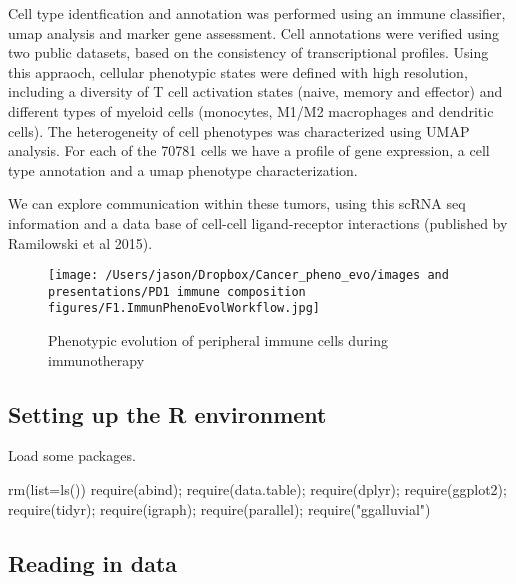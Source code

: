 \documentclass[
]{article}
\newenvironment{Shaded}{\begin{snugshade}}{\end{snugshade}}
\newcommand{\AttributeTok}[1]{\textcolor[rgb]{0.77,0.63,0.00}{#1}}
\newcommand{\FunctionTok}[1]{\textcolor[rgb]{0.00,0.00,0.00}{#1}}
\newcommand{\NormalTok}[1]{#1}
\newcommand{\StringTok}[1]{\textcolor[rgb]{0.31,0.60,0.02}{#1}}
\begin{document}
Cell type identfication and annotation was performed using an immune
classifier, umap analysis and marker gene assessment. Cell annotations
were verified using two public datasets, based on the consistency of
transcriptional profiles. Using this appraoch, cellular phenotypic
states were defined with high resolution, including a diversity of T
cell activation states (naive, memory and effector) and different types
of myeloid cells (monocytes, M1/M2 macrophages and dendritic cells). The
heterogeneity of cell phenotypes was characterized using UMAP analysis.
For each of the 70781 cells we have a profile of gene expression, a cell
type annotation and a umap phenotype characterization.

We can explore communication within these tumors, using this scRNA seq
information and a data base of cell-cell ligand-receptor interactions
(published by Ramilowski et al 2015).

\begin{figure}
\centering
\texttt{[image: /Users/jason/Dropbox/Cancer\_pheno\_evo/images and presentations/PD1 immune composition figures/F1.ImmunPhenoEvolWorkflow.jpg]}
\caption{Phenotypic evolution of peripheral immune cells during
immunotherapy}
\end{figure}

\hypertarget{setting-up-the-r-environment}{%
\subsection{Setting up the R
environment}\label{setting-up-the-r-environment}}

Load some packages.

\begin{Shaded}
\begin{Highlighting}[]
\FunctionTok{rm}\NormalTok{(}\AttributeTok{list=}\FunctionTok{ls}\NormalTok{())   }
\FunctionTok{require}\NormalTok{(abind); }\FunctionTok{require}\NormalTok{(data.table); }\FunctionTok{require}\NormalTok{(dplyr); }\FunctionTok{require}\NormalTok{(ggplot2); }\FunctionTok{require}\NormalTok{(tidyr); }\FunctionTok{require}\NormalTok{(igraph); }\FunctionTok{require}\NormalTok{(parallel); }\FunctionTok{require}\NormalTok{(}\StringTok{"ggalluvial"}\NormalTok{)}
\end{Highlighting}
\end{Shaded}

\hypertarget{reading-in-data}{%
\subsection{Reading in data}\label{reading-in-data}}
\end{document}
